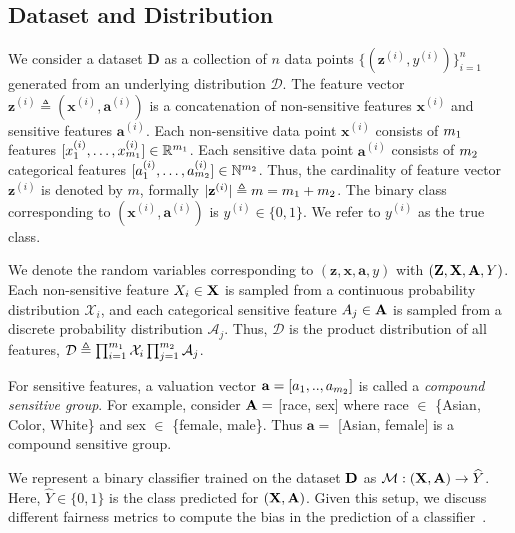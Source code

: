 \subsection{Dataset and Distribution}
We consider a dataset $ \mathbf{D} $ as a collection of $n$ data points  $\{(\mathbf{z}^{(i)}, y^{(i)})\}_{i=1}^n$  generated from an underlying distribution $\mathcal{D}$. The feature vector $\mathbf{z}^{(i)} \triangleq (\mathbf{x}^{(i)}, \mathbf{a}^{(i)}) $ is a concatenation of non-sensitive features $ \mathbf{x}^{(i)} $ and sensitive features $ \mathbf{a}^{(i)} $. Each non-sensitive data point $\mathbf{x}^{(i)}$ consists of $m_1$ features $[x^{(i)}_1, \dots, x^{(i)}_{m_1}] \in \mathbb{R}^{m_1} $. Each sensitive data point $\mathbf{a}^{(i)}$ consists of $m_2$ categorical features $[a^{(i)}_1, \dots, a^{(i)}_{m_2}] \in \mathbb{N}^{m_2} $. Thus, the cardinality of feature vector $ \mathbf{z}^{(i)} $ is denoted by $ m $, formally $ |\mathbf{z}^{(i)}| \triangleq m = m_1 + m_2 $. The binary class corresponding to $(\mathbf{x}^{(i)}, \mathbf{a}^{(i)})$ is $y^{(i)} \in \{0,1\}$. We refer to $y^{(i)}$ as the true class. 

We denote the random variables corresponding to $ (\mathbf{z}, \mathbf{x}, \mathbf{a},  y) $ with $ (\mathbf{Z}, \mathbf{X}, \mathbf{A}, Y) $. Each non-sensitive feature $ X_i \in \mathbf{X} $ is sampled from a continuous probability distribution {$ \mathcal{X}_i $}, and each categorical sensitive feature $ A_j \in \mathbf{A} $ is sampled from a discrete probability distribution {$ \mathcal{A}_j $}. Thus, $ \mathcal{D} $ is the product distribution of all features, $ \mathcal{D} \triangleq \prod_{i=1}^{m_1}\mathcal{X}_i \prod_{j=1}^{m_2} \mathcal{A}_j $.

For sensitive features, a valuation vector $ \mathbf{a} = [a_1, .., a_{m_2}] $ is called a \textit{compound sensitive group}. For example, consider $ \mathbf{A} = $ [race, sex] where race $ \in $ \{Asian, Color, White\} and sex $ \in $ \{female, male\}. Thus $ \mathbf{a} = $ [Asian, female]  is a compound sensitive group.


We represent a binary classifier trained on the dataset $\mathbf{D}$ as $\mathcal{M}: (\mathbf{X}, \mathbf{A}) \rightarrow \widehat{Y} $. Here, $\widehat{Y} \in \{0,1\}$ is the class predicted for $ (\mathbf{X}, \mathbf{A}) $. Given this setup, we discuss different fairness metrics to compute the bias in the prediction of a classifier~\cite{feldman2015certifying,hardt2016equality,nabi2018fair}.


